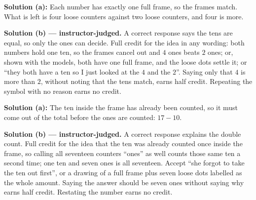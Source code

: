 \documentclass[12pt]{article}
\begin{document}

\textbf{Solution (a):} Each number has exactly one full frame, so the frames match. What is left is four loose counters against two loose counters, and four is more. 

\textbf{Solution (b) --- instructor-judged.} A correct response says the tens are equal, so only the ones can decide. Full credit for the idea in any wording: both numbers hold one ten, so the frames cancel out and $4$ ones beats $2$ ones; or, shown with the models, both have one full frame, and the loose dots settle it; or ``they both have a ten so I just looked at the $4$ and the $2$''. Saying only that $4$ is more than $2$, without noting that the tens match, earns half credit. Repeating the symbol with no reason earns no credit.


\textbf{Solution (a):} The ten inside the frame has already been counted, so it must come out of the total before the ones are counted: $17 - 10$. 

\textbf{Solution (b) --- instructor-judged.} A correct response explains the double count. Full credit for the idea that the ten was already counted once inside the frame, so calling all seventeen counters ``ones'' as well counts those same ten a second time; one ten and seven ones is all seventeen. Accept ``she forgot to take the ten out first'', or a drawing of a full frame plus seven loose dots labelled as the whole amount. Saying the answer should be seven ones without saying why earns half credit. Restating the number earns no credit.
\end{document}
